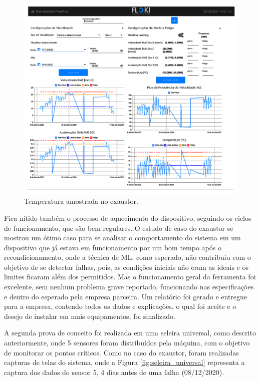 \begin{figure}[H]
    \caption{Temperatura amostrada no exaustor.}
    \begin{center}
        \includegraphics[scale=0.65, page=3]{resultados/img/resultados.pdf}
    \end{center}
    \label{fig:exaustor_temperatura}
\end{figure}

Fica nítido também o processo de aquecimento do dispositivo, seguindo os ciclos de funcionamento, que são bem regulares. O estudo de caso do 
exaustor se mostrou um ótimo caso para se analisar o comportamento do sistema em um dispositivo que já estava em funcionamento por um bom tempo 
após o recondicionamento, onde a técnica de ML, como esperado, não contribuiu com o objetivo de se detectar falhas, pois, as
condições iniciais não eram as ideais e os limites ficaram além dos permitidos. Mas o funcionamento geral da ferramenta foi excelente, sem nenhum
problema grave reportado, funcionando nas especificações e dentro do esperado pela empresa parceira. Um relatório foi gerado e entregue
para a empresa, contendo todos os dados e explicações, o qual foi aceite e o desejo de instalar em mais equipamentos, foi sinalizado.

A segunda prova de conceito foi realizada em uma seleira universal, como descrito anteriormente, onde 5 sensores foram distribuídos pela máquina, com o 
objetivo de monitorar os pontos críticos. Como no caso do exaustor, foram realizadas capturas de telas do sistema, onde a Figura
\ref{fig:seleira_universal} representa a captura dos dados do sensor 5, 4 dias antes de uma falha (08/12/2020). 

